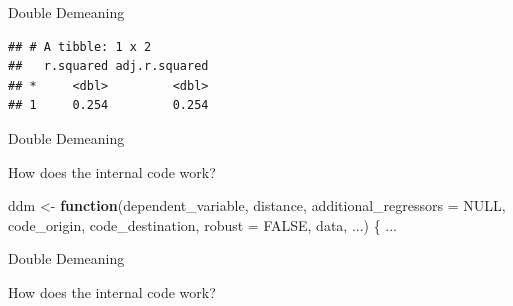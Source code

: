 \documentclass[ignorenonframetext,compress,aspectratio=169]{beamer}
\newenvironment{Shaded}{\begin{snugshade}}{\end{snugshade}}
\newcommand{\KeywordTok}[1]{\textcolor[rgb]{0.13,0.29,0.53}{\textbf{#1}}}
\newcommand{\DataTypeTok}[1]{\textcolor[rgb]{0.13,0.29,0.53}{#1}}
\newcommand{\StringTok}[1]{\textcolor[rgb]{0.31,0.60,0.02}{#1}}
\newcommand{\CommentTok}[1]{\textcolor[rgb]{0.56,0.35,0.01}{\textit{#1}}}
\newcommand{\OtherTok}[1]{\textcolor[rgb]{0.56,0.35,0.01}{#1}}
\newcommand{\ControlFlowTok}[1]{\textcolor[rgb]{0.13,0.29,0.53}{\textbf{#1}}}
\newcommand{\OperatorTok}[1]{\textcolor[rgb]{0.81,0.36,0.00}{\textbf{#1}}}
\newcommand{\NormalTok}[1]{#1}
\begin{document}
\begin{frame}[fragile]{Double Demeaning}

\begin{Shaded}
\end{Shaded}

\begin{verbatim}
## # A tibble: 1 x 2
##   r.squared adj.r.squared
## *     <dbl>         <dbl>
## 1     0.254         0.254
\end{verbatim}

\end{frame}

\begin{frame}[fragile]{Double Demeaning}

How does the internal code work?

\begin{Shaded}
\begin{Highlighting}[]
\NormalTok{ddm <-}\StringTok{ }\ControlFlowTok{function}\NormalTok{(dependent_variable,}
\NormalTok{                distance,}
                \DataTypeTok{additional_regressors =} \OtherTok{NULL}\NormalTok{,}
\NormalTok{                code_origin,}
\NormalTok{                code_destination,}
                \DataTypeTok{robust =} \OtherTok{FALSE}\NormalTok{,}
\NormalTok{                data, ...) \{}
\NormalTok{...}
\end{Highlighting}
\end{Shaded}

\end{frame}

\begin{frame}[fragile]{Double Demeaning}

How does the internal code work?

\begin{Shaded}
\end{Shaded}

\end{frame}
\end{document}
